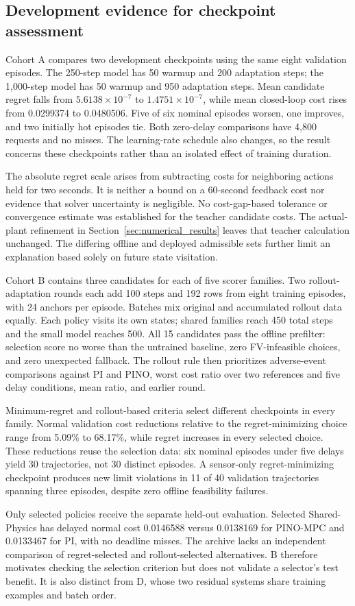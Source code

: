 \subsection{Development evidence for checkpoint assessment}

Cohort A compares two development checkpoints using the same eight validation episodes. The 250-step model has 50 warmup and 200 adaptation steps; the 1,000-step model has 50 warmup and 950 adaptation steps. Mean candidate regret falls from $5.6138\times10^{-7}$ to $1.4751\times10^{-7}$, while mean closed-loop cost rises from 0.0299374 to 0.0480506. Five of six nominal episodes worsen, one improves, and two initially hot episodes tie. Both zero-delay comparisons have 4,800 requests and no misses. The learning-rate schedule also changes, so the result concerns these checkpoints rather than an isolated effect of training duration.

The absolute regret scale arises from subtracting costs for neighboring actions held for two seconds. It is neither a bound on a 60-second feedback cost nor evidence that solver uncertainty is negligible. No cost-gap-based tolerance or convergence estimate was established for the teacher candidate costs. The actual-plant refinement in Section~\ref{sec:numerical_results} leaves that teacher calculation unchanged. The differing offline and deployed admissible sets further limit an explanation based solely on future state visitation.

Cohort B contains three candidates for each of five scorer families. Two rollout-adaptation rounds each add 100 steps and 192 rows from eight training episodes, with 24 anchors per episode. Batches mix original and accumulated rollout data equally. Each policy visits its own states; shared families reach 450 total steps and the small model reaches 500. All 15 candidates pass the offline prefilter: selection score no worse than the untrained baseline, zero FV-infeasible choices, and zero unexpected fallback. The rollout rule then prioritizes adverse-event comparisons against PI and PINO, worst cost ratio over two references and five delay conditions, mean ratio, and earlier round.

Minimum-regret and rollout-based criteria select different checkpoints in every family. Normal validation cost reductions relative to the regret-minimizing choice range from 5.09\% to 68.17\%, while regret increases in every selected choice. These reductions reuse the selection data: six nominal episodes under five delays yield 30 trajectories, not 30 distinct episodes. A sensor-only regret-minimizing checkpoint produces new limit violations in 11 of 40 validation trajectories spanning three episodes, despite zero offline feasibility failures.

Only selected policies receive the separate held-out evaluation. Selected Shared-Physics has delayed normal cost 0.0146588 versus 0.0138169 for PINO-MPC and 0.0133467 for PI, with no deadline misses. The archive lacks an independent comparison of regret-selected and rollout-selected alternatives. B therefore motivates checking the selection criterion but does not validate a selector's test benefit. It is also distinct from D, whose two residual systems share training examples and batch order.

